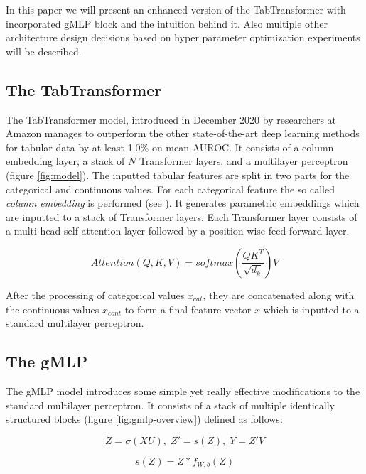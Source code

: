 \documentclass{article}
\begin{document}
In this paper we will present an enhanced version of the TabTransformer with incorporated gMLP block and the intuition behind it. Also multiple other architecture design decisions based on hyper parameter optimization experiments will be described.

\subsection{The TabTransformer}
\label{sec:tabtransformer}

The TabTransformer model, introduced in December 2020 by researchers at Amazon manages to outperform the other state-of-the-art deep learning methods for tabular data by at least 1.0\% on mean AUROC. It consists of a column embedding layer, a stack of $N$ Transformer layers, and a multilayer perceptron (figure \ref{fig:model}). The inputted tabular features are split in two parts for the categorical and continuous values. For each categorical feature the so called \textit{column embedding} is performed (see \cite{Huang2020TabTransformerTD}). It generates parametric embeddings which are inputted to a stack of Transformer layers. Each Transformer layer \cite{vaswani2017attention} consists of a multi-head self-attention layer followed by a position-wise feed-forward layer.

\begin{equation}
    Attention(Q, K, V) = softmax(\frac{QK^T}{\sqrt{d_k}})V
\end{equation}

After the processing of categorical values $x_{cat}$, they are concatenated along with the continuous values $x_{cont}$ to form a final feature vector $x$ which is inputted to a standard  multilayer perceptron.

\subsection{The gMLP}
\label{sec:gmlp}

The gMLP model \cite{Liu2021PayAT} introduces some simple yet really effective modifications to the standard multilayer perceptron. It consists of a stack of multiple identically structured blocks (figure \ref{fig:gmlp-overview}) defined as follows:

\begin{equation}
    Z = \sigma(XU), \; Z' = s(Z), \; Y = Z'V
\end{equation}

\begin{equation}
    s(Z) = Z * f_{W,b}(Z)
\end{equation}
\end{document}
